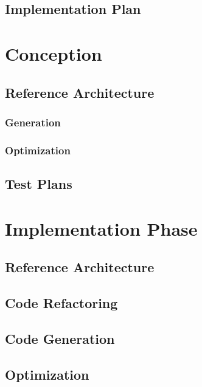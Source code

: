 \documentclass{report}
\begin{document}
	\section{Implementation Plan}

\chapter{Conception}

	\section{Reference Architecture}

		\subsection{Generation}

		\subsection{Optimization}

	\section{Test Plans}
	
\chapter{Implementation Phase}

	\section{Reference Architecture}

	\section{Code Refactoring}

	\section{Code Generation}

	\section{Optimization}
\end{document}
